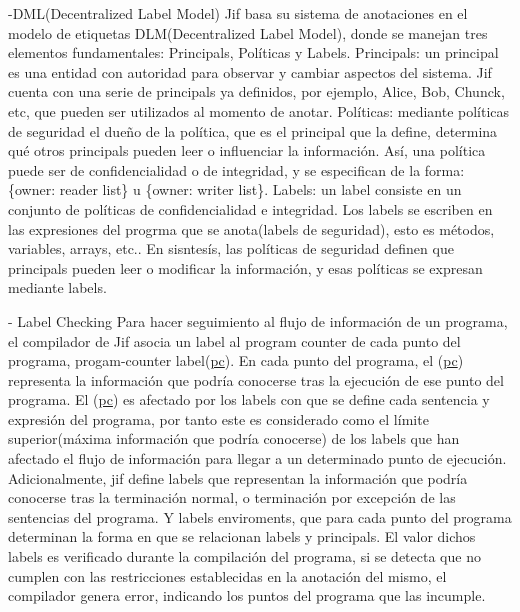 -DML(Decentralized Label Model)\newline
Jif basa su sistema de anotaciones en el modelo de etiquetas DLM(Decentralized
Label Model), donde se manejan tres elementos fundamentales: Principals,
Políticas y Labels.\newline
Principals: un principal es una entidad con autoridad para observar y cambiar
aspectos del sistema. Jif cuenta con una serie de principals ya
definidos, por ejemplo, Alice, Bob, Chunck, etc, que pueden ser
utilizados al momento de anotar.\newline 
Políticas: mediante políticas de seguridad el dueño de la política, que es el
principal que la define, determina qué otros principals pueden leer o
influenciar la información. Así, una política puede ser de confidencialidad o de
integridad, y se especifican de la forma: \{owner: reader list\} u
\{owner: writer list\}.\newline 
Labels: un label consiste en un conjunto de políticas de confidencialidad e
integridad. Los labels se escriben en las expresiones del progrma que se
anota(labels de seguridad), esto es métodos, variables, arrays, etc..\newline 
En sisntesís, las políticas de seguridad definen que principals pueden leer o
modificar la información, y esas políticas se expresan mediante labels.\newline

- Label Checking\newline
Para hacer seguimiento al flujo de información de un programa, el compilador de
Jif asocia un label al program counter de cada punto del programa,
progam-counter label(\underline{pc}). En cada punto del programa, el
(\underline{pc}) representa la información que podría conocerse tras la
ejecución de ese punto del programa.
El (\underline{pc}) es afectado por los labels con que se define cada sentencia
y expresión del programa, por tanto este es considerado como el límite
superior(máxima información que podría conocerse) de los labels que han afectado
el flujo de información para llegar a un determinado punto de ejecución.\newline
Adicionalmente, jif define labels que representan la información que podría
conocerse tras la terminación normal, o terminación por excepción de las
sentencias del programa. Y labels enviroments, que para cada punto del programa
determinan la forma en que se relacionan labels y principals.\newline
El valor dichos labels es verificado durante la compilación del programa, si se
detecta que no cumplen con las restricciones establecidas en la anotación del
mismo, el compilador genera error, indicando los puntos del programa que las
incumple.\newline

